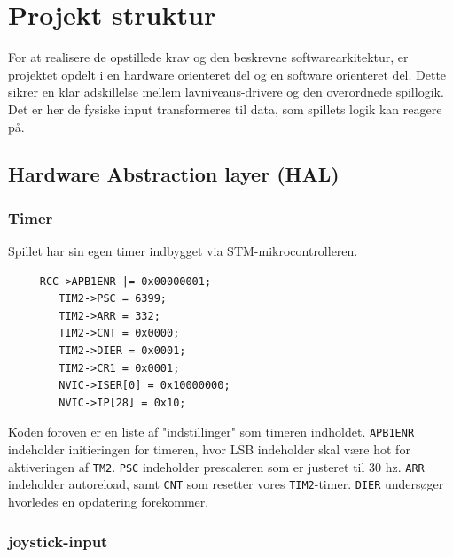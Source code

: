 \chapter{Projekt struktur} \label{chap:analyse}

For at realisere de opstillede krav og den beskrevne softwarearkitektur, er projektet opdelt i en hardware orienteret del og en software orienteret del. Dette sikrer en klar adskillelse mellem lavniveaus-drivere og den overordnede spillogik. Det er her de fysiske input transformeres til data, som spillets logik kan reagere på.




\section{Hardware Abstraction layer (HAL)} \label{chap:Projektstruktur_sec:hardwere}
\vspace{0.5em}

\vspace{3pt}
\subsection{Timer}
\vspace{3pt}

Spillet har sin egen timer indbygget via STM-mikrocontrolleren. 

\vspace{1em}
\begin{lstlisting}
     RCC->APB1ENR |= 0x00000001;
	    TIM2->PSC = 6399; 
	    TIM2->ARR = 332;   
	    TIM2->CNT = 0x0000;  
	    TIM2->DIER = 0x0001;
	    TIM2->CR1 = 0x0001; 
        NVIC->ISER[0] = 0x10000000; 
	    NVIC->IP[28] = 0x10;
\end{lstlisting}
\vspace{-2em}

Koden foroven er en liste af "indstillinger" som timeren indholdet. \lstinline!APB1ENR! indeholder initieringen for timeren, hvor LSB indeholder skal være hot for aktiveringen af \lstinline!TM2!. \lstinline!PSC! indeholder prescaleren som er justeret til 30 hz. \lstinline!ARR! indeholder autoreload, samt \lstinline!CNT! som resetter vores \lstinline!TIM2!-timer. \lstinline!DIER! undersøger hvorledes en opdatering forekommer. 

\vspace{3pt}
\subsection{joystick-input}
\vspace{3pt}

